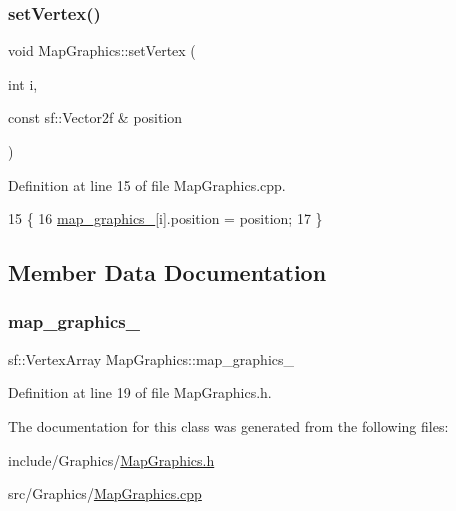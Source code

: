 \subsubsection{\texorpdfstring{set\+Vertex()}{setVertex()}}
{\footnotesize\ttfamily void Map\+Graphics\+::set\+Vertex (\begin{DoxyParamCaption}\item[{int}]{i,  }\item[{const sf\+::\+Vector2f \&}]{position }\end{DoxyParamCaption})}



Definition at line 15 of file Map\+Graphics.\+cpp.


\begin{DoxyCode}
15                                                              \{
16     \hyperlink{classMapGraphics_a2136d586176f0c3a008182ff3fba50e3}{map\_graphics\_}[i].position = position;
17 \}
\end{DoxyCode}


\subsection{Member Data Documentation}
\mbox{\label{classMapGraphics_a2136d586176f0c3a008182ff3fba50e3}} 
\subsubsection{\texorpdfstring{map\+\_\+graphics\+\_\+}{map\_graphics\_}}
{\footnotesize\ttfamily sf\+::\+Vertex\+Array Map\+Graphics\+::map\+\_\+graphics\+\_\+\hspace{0.3cm}{\ttfamily [private]}}



Definition at line 19 of file Map\+Graphics.\+h.



The documentation for this class was generated from the following files\+:\begin{DoxyCompactItemize}
\item 
include/\+Graphics/\hyperlink{MapGraphics_8h}{Map\+Graphics.\+h}\item 
src/\+Graphics/\hyperlink{MapGraphics_8cpp}{Map\+Graphics.\+cpp}\end{DoxyCompactItemize}
